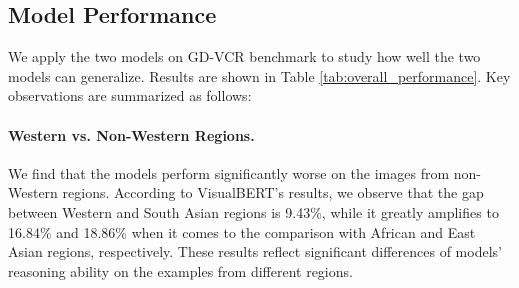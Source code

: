 \documentclass[11pt]{article}
\begin{document}
\begin{table*}[t]
    \centering
    \caption{Accuracy (\%) on the subset of each region in GD-VCR and the original VCR development set. With regard to Western regions, two models' performance gap of the original VCR development set and other regions is shown. We also report human's accuracy (\%) over each region subset. Annotators are from United Kingdom and United States according to MTurk. $^*$ denotes the reported result in~\citet{zellers2019vcr}.}
    \label{tab:overall_performance}
\end{table*}

\subsection{Model Performance}
\label{sec:model_performance}
We apply the two models on GD-VCR benchmark to study how well the two models can generalize. Results are shown in Table \ref{tab:overall_performance}. Key observations are summarized as follows:

\paragraph{Western vs. Non-Western Regions.} We find that the models perform significantly worse on the images from non-Western regions. According to VisualBERT's results, we observe that the gap between Western and South Asian regions is 9.43\%, while it greatly amplifies to 16.84\% and 18.86\% when it comes to the comparison with African and East Asian regions, respectively. These results reflect significant differences of models' reasoning ability on the examples from different regions. 
\end{document}
